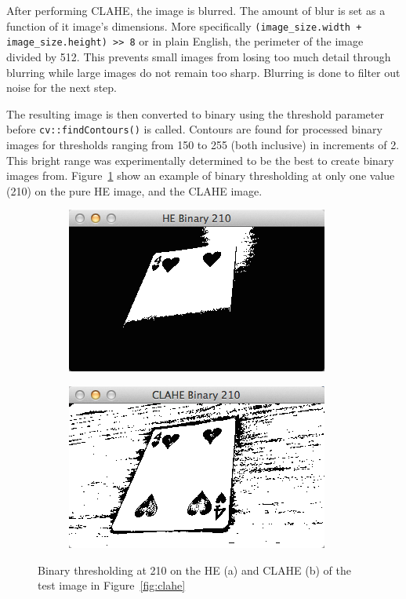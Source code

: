 \documentclass[a4paper,12pt,notitlepage]{article}
\newcommand{\code}[1]{\lstinline[basicstyle=\ttfamily,breakautoindent=false,postbreak={}]|#1|}
\begin{document}
			After performing CLAHE, the image is blurred. The amount of blur is set as a function of it image's dimensions. More specifically \code{(image_size.width + image_size.height) >> 8} or in plain English, the perimeter of the image divided by 512. This prevents small images from losing too much detail through blurring while large images do not remain too sharp. Blurring is done to filter out noise for the next step.

			The resulting image is then converted to binary using the threshold parameter before \code{cv::findContours()} is called. Contours are found for processed binary images for thresholds ranging from 150 to 255 (both inclusive) in increments of 2. This bright range was experimentally determined to be the best to create binary images from. Figure~\ref{fig:clahebin} show an example of binary thresholding at only one value (210) on the pure HE image, and the CLAHE image.

			\begin{figure}[H]
				\centering
				\begin{subfigure}[b]{0.4\textwidth}
					\centering
					\includegraphics[width=\textwidth]{hebin}
					\caption{}
				\end{subfigure}
				\qquad
				\begin{subfigure}[b]{0.4\textwidth}
					\centering
					\includegraphics[width=\textwidth]{clahebin}
					\caption{}
				\end{subfigure}
				\caption{Binary thresholding at 210 on the HE (a) and CLAHE (b) of the test image in Figure~\ref{fig:clahe}}
				\label{fig:clahebin}
			\end{figure}
\end{document}
